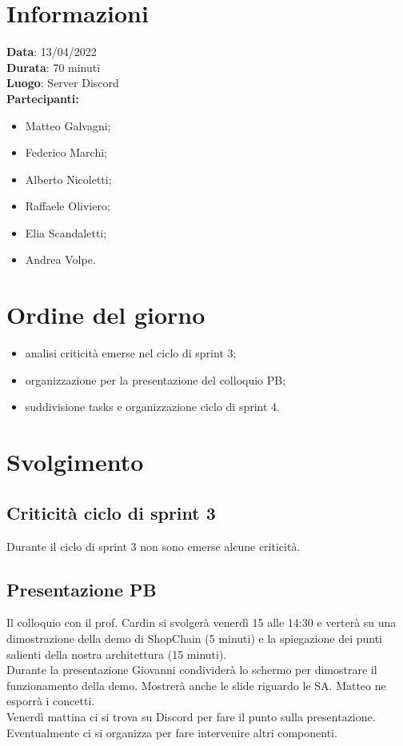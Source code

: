 \documentclass[a4paper, 12pt]{article}
\begin{document}
\makefrontpage

\section{Informazioni}
\textbf{Data}: 13/04/2022\\
\textbf{Durata}: 70 minuti\\
\textbf{Luogo}: Server Discord\\

\textbf{Partecipanti:}
\begin{itemize}
	\item Matteo Galvagni;
	\item Federico Marchi;
	\item Alberto Nicoletti;
	\item Raffaele Oliviero;
	\item Elia Scandaletti;
	\item Andrea Volpe.
\end{itemize}


\section{Ordine del giorno}
\begin{itemize}
	\item analisi criticità emerse nel ciclo di sprint 3;
	\item organizzazione per la presentazione del colloquio PB;
	\item suddivisione tasks e organizzazione ciclo di sprint 4.
\end{itemize}

\section{Svolgimento}

\subsection{Criticità ciclo di sprint 3}
Durante il ciclo di sprint 3 non sono emerse alcune criticità.

\subsection{Presentazione PB}
Il colloquio con il prof. Cardin si svolgerà venerdì 15 alle 14:30 e verterà su una dimostrazione della demo di ShopChain (5 minuti) e la spiegazione dei punti salienti della nostra architettura (15 minuti).\\
Durante la presentazione Giovanni condividerà lo schermo per dimostrare il funzionamento della demo. Mostrerà anche le slide riguardo le SA. Matteo ne esporrà i concetti.\\
Venerdì mattina ci si trova su Discord per fare il punto sulla presentazione. Eventualmente ci si organizza per fare intervenire altri componenti.
\end{document}
